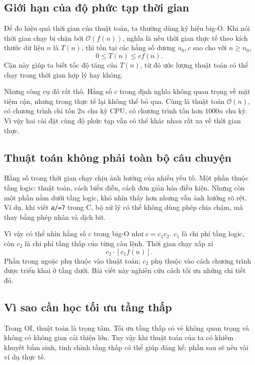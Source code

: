 \documentclass[11pt]{article}
\newcommand{\Oh}{\mathcal{O}}
\begin{document}
\subsection{Giới hạn của độ phức tạp thời gian}

Để đo hiệu quả thời gian của thuật toán, ta thường dùng ký hiệu big-O. Khi nói
thời gian chạy bị chặn bởi \(\Oh(f(n))\), nghĩa là nếu thời gian thực tế theo
kích thước dữ liệu \(n\) là \(T(n)\), thì tồn tại các hằng số dương \(n_0,c\)
sao cho với \(n\ge n_0\),
\[
  0\le T(n)\le c f(n).
\]
Cận này giúp ta biết tốc độ tăng của \(T(n)\), từ đó ước lượng thuật toán có
thể chạy trong thời gian hợp lý hay không.

Nhưng công cụ đó rất thô. Hằng số \(c\) trong định nghĩa không quan trọng về
mặt tiệm cận, nhưng trong thực tế lại không thể bỏ qua. Cùng là thuật toán
\(\Oh(n)\), có chương trình chỉ tốn \(2n\) chu kỳ CPU, có chương trình tốn hơn
\(1000n\) chu kỳ. Vì vậy hai cài đặt cùng độ phức tạp vẫn có thể khác nhau rất
xa về thời gian thực.

\subsection{Thuật toán không phải toàn bộ câu chuyện}

Hằng số trong thời gian chạy chịu ảnh hưởng của nhiều yếu tố. Một phần thuộc
tầng logic: thuật toán, cách biểu diễn, cách đơn giản hóa điều kiện. Nhưng còn
một phần nằm dưới tầng logic, khó nhìn thấy hơn nhưng vẫn ảnh hưởng rõ rệt. Ví
dụ, khi viết \texttt{a/=7} trong C, bộ xử lý có thể không dùng phép chia chậm,
mà thay bằng phép nhân và dịch bit.

Vì vậy có thể nhìn hằng số \(c\) trong big-O như \(c=c_1c_2\). \(c_1\) là chi
phí tầng logic, còn \(c_2\) là chi phí tầng thấp của từng câu lệnh. Thời gian
chạy xấp xỉ
\[
  c_2 \cdot [c_1 f(n)].
\]
Phần trong ngoặc phụ thuộc vào thuật toán; \(c_2\) phụ thuộc vào cách chương
trình được triển khai ở tầng dưới. Bài viết này nghiên cứu cách tối ưu những
chi tiết đó.

\subsection{Vì sao cần học tối ưu tầng thấp}

Trong OI, thuật toán là trọng tâm. Tối ưu tầng thấp có vẻ không quan trọng và
không có không gian cải thiện lớn. Tuy vậy khi thuật toán của ta có khiếm
khuyết bẩm sinh, tinh chỉnh tầng thấp có thể giúp đáng kể; phần sau sẽ nêu
vài ví dụ thực tế.
\end{document}
